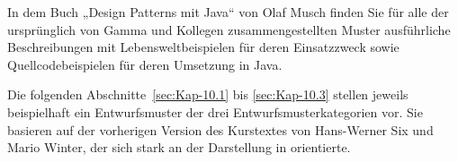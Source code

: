 In dem Buch „Design Patterns mit Java“ von Olaf Musch \cite{mus21} finden Sie für alle der ursprünglich von Gamma und Kollegen zusammengestellten Muster ausführliche Beschreibungen mit Lebensweltbeispielen für deren Einsatzzweck sowie Quellcodebeispielen für deren Umsetzung in Java.

Die folgenden Abschnitte~\ref{sec:Kap-10.1} bis \ref{sec:Kap-10.3} stellen jeweils beispielhaft ein Entwurfsmuster der drei Entwurfsmusterkategorien vor. Sie basieren auf der vorherigen Version des Kurstextes von Hans-Werner Six und Mario Winter, der sich stark an der Darstellung in \cite{gam95} orientierte. 

\clearpage


\clearpage


\clearpage


\clearpage


\clearpage

